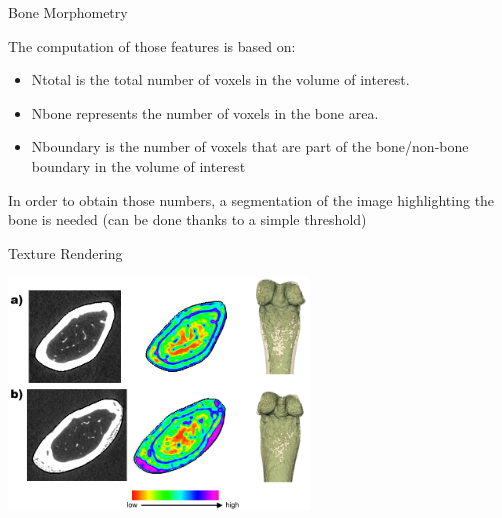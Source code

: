 \documentclass[10pt,aspectratio=169]{beamer}
\begin{document}
\begin{frame}{Bone Morphometry}
{    The computation of those features is based on:
    \begin{itemize}
      \item Ntotal is the total number of voxels in the volume of interest.
      \item Nbone represents the number of voxels in the bone area.
      \item Nboundary is the number of voxels that are part of the bone/non-bone boundary in the volume of interest
    \end{itemize}
    In order to obtain those numbers, a segmentation of the image highlighting the bone is needed (can be done thanks to a simple threshold)
  }
\end{frame}

{
\begin{frame}{Texture Rendering}
  \begin{center}
  \includegraphics[width=0.6\textwidth]{./figures/FigureRunLengthNonUniformity_withVolume}\\
  \end{center}
  \vspace{0.1cm}
  \centering
\end{frame}
}
\end{document}
